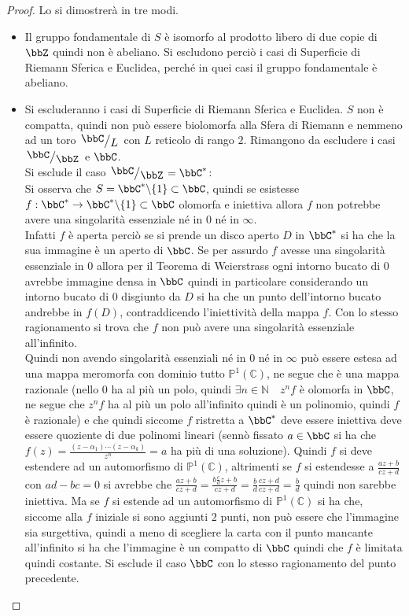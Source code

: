 \begin{proof}Lo si dimostrerà in tre modi.
\begin{itemize}
\item Il gruppo fondamentale di $S$ è isomorfo al prodotto libero di due copie di $\bbZ$ quindi non è abeliano. Si escludono perciò i casi di Superficie di Riemann Sferica e Euclidea, perché in quei casi il gruppo fondamentale è abeliano.
\item Si escluderanno i casi di Superficie di Riemann Sferica e Euclidea. $S$ non è compatta, quindi non può essere biolomorfa alla Sfera di Riemann e nemmeno ad un toro $\quotient{\bbC}{L}$ con $L$ reticolo di rango $2$. Rimangono da escludere i casi $\quotient{\bbC}{\bbZ}$ e $\bbC$.\\
Si esclude il caso $\quotient{\bbC}{\bbZ}={\bbC}^*$:\\
Si osserva che $S=\bbC^*\minus\{ 1\}\subset\bbC$, quindi se esistesse $f:\bbC^*\rightarrow\bbC^*\minus\{ 1\}\subset\bbC$ olomorfa e iniettiva allora $f$ non potrebbe avere una singolarità essenziale né in $0$ né in $\infty$.\\
Infatti $f$ è aperta perciò se si prende un disco aperto $D$ in $\bbC^*$ si ha che la sua immagine è un aperto di $\bbC$. Se per assurdo $f$ avesse una singolarità essenziale in $0$ allora per il Teorema di Weierstrass ogni intorno bucato di $0$ avrebbe immagine densa in $\bbC$ quindi in particolare considerando un intorno bucato di $0$ disgiunto da $D$ si ha che un punto dell'intorno bucato andrebbe in $f(D)$, contraddicendo l'iniettività della mappa $f$. Con lo stesso ragionamento si trova che $f$ non può avere una singolarità essenziale all'infinito.\\
Quindi non avendo singolarità essenziali né in $0$ né in $\infty$ può essere estesa ad una mappa meromorfa con dominio tutto $\mathbb{P}^1(\mathbb{C})$, ne segue che è una mappa razionale (nello $0$ ha al più un polo, quindi $\exists n\in\mathbb{N} \quad z^nf$ è olomorfa in $\bbC$, ne segue che $z^nf$ ha al più un polo all'infinito quindi è un polinomio, quindi $f$ è razionale) e che quindi siccome $f$ ristretta a $\bbC^*$ deve essere iniettiva deve essere quoziente di due polinomi lineari (sennò fissato $a\in\bbC$ si ha che $f(z)=\frac{(z-\alpha_1)\cdots (z-\alpha_k)}{z^n}=a$ ha più di una soluzione). Quindi $f$ si deve estendere ad un automorfismo di $\mathbb{P}^1(\mathbb{C})$, altrimenti se $f$ si estendesse a $\frac{az+b}{cz+d}$ con $ad-bc=0$ si avrebbe che $\frac{az+b}{cz+d}=\frac{b\frac{c}{d} z+b}{cz+d}=\frac{b}{d} \frac{cz+d}{cz+d}=\frac{b}{d}$ quindi non sarebbe iniettiva. Ma se $f$ si estende ad un automorfismo di $\mathbb{P}^1(\mathbb{C})$ si ha che, siccome alla $f$ iniziale si sono aggiunti $2$ punti, non può essere che l'immagine sia surgettiva, quindi a meno di scegliere la carta con il punto mancante all'infinito si ha che l'immagine è un compatto di $\bbC$ quindi che $f$ è limitata quindi costante.
Si esclude il caso $\bbC$ con lo stesso ragionamento del punto precedente.


\end{itemize}
\end{proof}
